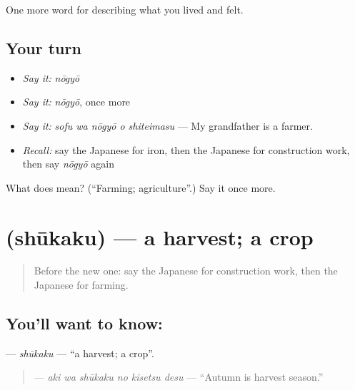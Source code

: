 \begin{grammarlens}[title={What you've built}]
One more word for describing what you lived and felt.
\end{grammarlens}

\subsection*{Your turn}
\begin{itemize}
\raggedright
  \item \emph{Say it:} \emph{nōgyō}
  \item \emph{Say it:} \emph{nōgyō}, once more
  \item \emph{Say it:} \emph{sofu wa nōgyō o shiteimasu} — My grandfather is a farmer.
  \item \emph{Recall:} say the Japanese for iron, then the Japanese for construction work, then say \emph{nōgyō} again
\end{itemize}

\begin{tcolorbox}[breakable,colback=teal!4,colframe=teal!35!black,title={Before you move on}]
What does  mean? (\textquotedblleft{}Farming; agriculture\textquotedblright{}.) Say it once more.
\end{tcolorbox}
\section[\texorpdfstring{\ja{しゅうかく} (shūkaku)}{しゅうかく (shūkaku)}]{ (shūkaku) — a harvest; a crop}

\label{lesson:JA-C489-shuukaku}



\begin{quote}
Before the new one: say the Japanese for construction work, then the Japanese for farming.
\end{quote}

\subsection*{You'll want to know: }
\textbf{} — \emph{shūkaku} — \textquotedblleft{}a harvest; a crop\textquotedblright{}.

\begin{quote}
\textbf{  } — \emph{aki wa shūkaku no kisetsu desu} — \textquotedblleft{}Autumn is harvest season.\textquotedblright{}
\end{quote}

